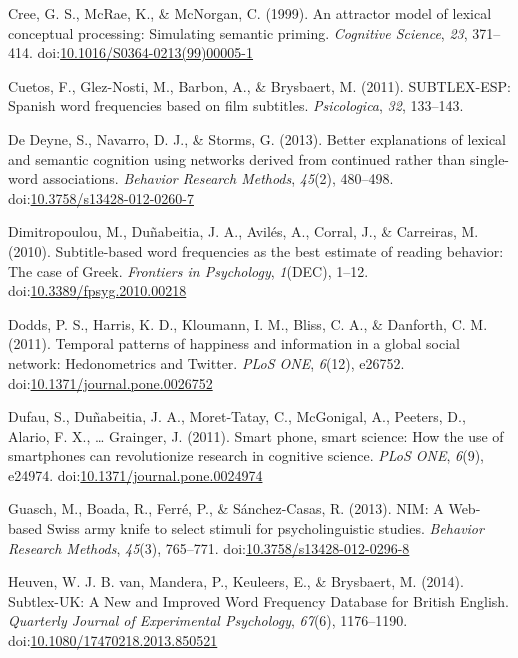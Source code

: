 \documentclass[english,man]{apa6}
\theoremstyle{definition}
\theoremstyle{definition}
\theoremstyle{definition}
\theoremstyle{remark}
\begin{document}
\hypertarget{ref-Cree1999}{}
Cree, G. S., McRae, K., \& McNorgan, C. (1999). An attractor model of
lexical conceptual processing: Simulating semantic priming.
\emph{Cognitive Science}, \emph{23}, 371--414.
doi:\href{https://doi.org/10.1016/S0364-0213(99)00005-1}{10.1016/S0364-0213(99)00005-1}

\hypertarget{ref-Cuetos2011}{}
Cuetos, F., Glez-Nosti, M., Barbon, A., \& Brysbaert, M. (2011).
SUBTLEX-ESP: Spanish word frequencies based on film subtitles.
\emph{Psicologica}, \emph{32}, 133--143.

\hypertarget{ref-DeDeyne2013}{}
De Deyne, S., Navarro, D. J., \& Storms, G. (2013). Better explanations
of lexical and semantic cognition using networks derived from continued
rather than single-word associations. \emph{Behavior Research Methods},
\emph{45}(2), 480--498.
doi:\href{https://doi.org/10.3758/s13428-012-0260-7}{10.3758/s13428-012-0260-7}

\hypertarget{ref-Dimitropoulou2010}{}
Dimitropoulou, M., Duñabeitia, J. A., Avilés, A., Corral, J., \&
Carreiras, M. (2010). Subtitle-based word frequencies as the best
estimate of reading behavior: The case of Greek. \emph{Frontiers in
Psychology}, \emph{1}(DEC), 1--12.
doi:\href{https://doi.org/10.3389/fpsyg.2010.00218}{10.3389/fpsyg.2010.00218}

\hypertarget{ref-Dodds2011}{}
Dodds, P. S., Harris, K. D., Kloumann, I. M., Bliss, C. A., \& Danforth,
C. M. (2011). Temporal patterns of happiness and information in a global
social network: Hedonometrics and Twitter. \emph{PLoS ONE},
\emph{6}(12), e26752.
doi:\href{https://doi.org/10.1371/journal.pone.0026752}{10.1371/journal.pone.0026752}

\hypertarget{ref-Dufau2011}{}
Dufau, S., Duñabeitia, J. A., Moret-Tatay, C., McGonigal, A., Peeters,
D., Alario, F. X., \ldots{} Grainger, J. (2011). Smart phone, smart
science: How the use of smartphones can revolutionize research in
cognitive science. \emph{PLoS ONE}, \emph{6}(9), e24974.
doi:\href{https://doi.org/10.1371/journal.pone.0024974}{10.1371/journal.pone.0024974}

\hypertarget{ref-Guasch2013}{}
Guasch, M., Boada, R., Ferré, P., \& Sánchez-Casas, R. (2013). NIM: A
Web-based Swiss army knife to select stimuli for psycholinguistic
studies. \emph{Behavior Research Methods}, \emph{45}(3), 765--771.
doi:\href{https://doi.org/10.3758/s13428-012-0296-8}{10.3758/s13428-012-0296-8}

\hypertarget{ref-VanHeuven2014}{}
Heuven, W. J. B. van, Mandera, P., Keuleers, E., \& Brysbaert, M.
(2014). Subtlex-UK: A New and Improved Word Frequency Database for
British English. \emph{Quarterly Journal of Experimental Psychology},
\emph{67}(6), 1176--1190.
doi:\href{https://doi.org/10.1080/17470218.2013.850521}{10.1080/17470218.2013.850521}
\end{document}
